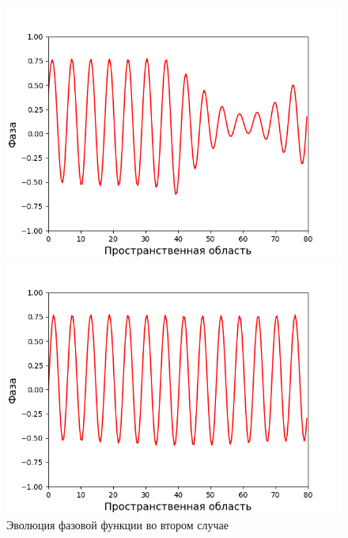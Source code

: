 \begin{figure}[p]
    \centering
    \begin{minipage}{0.49\linewidth}
        \includegraphics[width=\linewidth]{images/5-data_data_50000.bin.png}
    \end{minipage}
    \hfill
    \begin{minipage}{0.49\linewidth}
        \includegraphics[width=\linewidth]{images/5-data_data_1000000.bin.png}
    \end{minipage}
    \caption{Эволюция фазовой функции во втором случае}
    \label{fig:evolution_2}
\end{figure}

